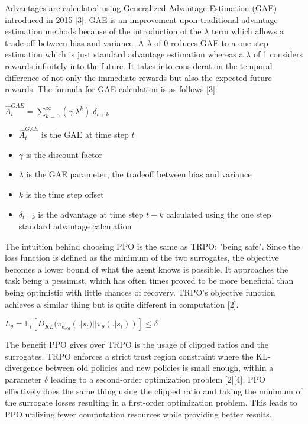 \documentclass{article}
\begin{document}
    Advantages are calculated using Generalized Advantage Estimation (GAE) introduced in 2015 [3]. GAE is an improvement upon traditional advantage estimation methods because of the introduction of the $\lambda$ term which allows a trade-off between bias and variance. A $\lambda$ of 0 reduces GAE to a one-step estimation which is just standard advantage estimation whereas a $\lambda$ of 1 considers rewards infinitely into the future. It takes into consideration the temporal difference of not only the immediate rewards but also the expected future rewards. The formula for GAE calculation is as follows [3]:
    
    \begin{center}
        $\hat{A}^{GAE}_{t} = \sum_{k=0}^{\infty}(\gamma.\lambda^{k}).\delta_{t+k}$
    \end{center}
    \begin{itemize}
        \item $\hat{A}^{GAE}_{t}$ is the GAE at time step $t$
        \item $\gamma$ is the discount factor
        \item $\lambda$ is the GAE parameter, the tradeoff between bias and variance
        \item $k$ is the time step offset
        \item $\delta_{t+k}$ is the advantage at time step $t+k$ calculated using the one step standard advantage calculation
    \end{itemize}
    
    The intuition behind choosing PPO is the same as TRPO: "being safe". Since the loss function is defined as the minimum of the two surrogates, the objective becomes a lower bound of what the agent knows is possible. It approaches the task being a pessimist, which has often times proved to be more beneficial than being optimistic with little chances of recovery. TRPO's objective function achieves a similar thing but is quite different in computation [2].
    
    \begin{center}
        $L_{\theta} = \mathbb{E}_{t}[D_{KL}(\pi_{\theta_{old}}(.|s_{t}) || \pi_{\theta}(.|s_{t}))] \leq \delta$
    \end{center}
    
    The benefit PPO gives over TRPO is the usage of clipped ratios and the surrogates. TRPO enforces a strict trust region constraint where the KL-divergence between old policies and new policies is small enough, within a parameter $\delta$ leading to a second-order optimization problem [2][4]. PPO effectively does the same thing using the clipped ratio and taking the minimum of the surrogate losses resulting in a first-order optimization problem. This leads to PPO utilizing fewer computation resources while providing better results.
    
\end{document}
